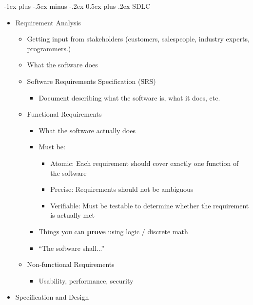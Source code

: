 \documentclass[letterpaper, 8pt]{extarticle}
\makeatletter
\renewcommand{\section}{\@startsection{section}{1}{0mm}%
                                {-1ex plus -.5ex minus -.2ex}%
                                {0.5ex plus .2ex}%
                                {\normalfont\normalsize\bfseries}}
\makeatother
\begin{document}
\begin{multicols*}{5}
  \section{SDLC}
  \begin{itemize}
    \item Requirement Analysis
          \begin{itemize}
            \item Getting input from stakeholders (customers, salespeople, industry experts, programmers.)
            \item What the software does
            \item Software Requirements Specification (SRS)
                  \begin{itemize}
                    \item Document describing what the software is, what it does, etc.
                  \end{itemize}
            \item Functional Requirements
                  \begin{itemize}
                    \item What the software actually does
                    \item Must be:
                          \begin{itemize}
                            \item Atomic: Each requirement should cover exactly one function of the software
                            \item Precise: Requirements should not be ambiguous
                            \item Verifiable: Must be testable to determine whether the requirement is actually met
                          \end{itemize}
                    \item Things you can \textbf{prove} using logic / discrete math
                    \item ``The software shall...''
                  \end{itemize}
            \item Non-functional Requirements
                  \begin{itemize}
                    \item Usability, performance, security
                  \end{itemize}
          \end{itemize}
    \item Specification and Design

\end{itemize}
\end{multicols*}
\end{document}
